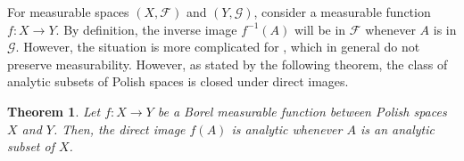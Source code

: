 \documentclass[12pt]{article}
\newtheorem*{theorem*}{Theorem}
\begin{document}

For measurable spaces $(X,\mathcal{F})$ and $(Y,\mathcal{G})$, consider a measurable function $f\colon X\rightarrow Y$. By definition, the inverse image $f^{-1}(A)$ will be in $\mathcal{F}$ whenever $A$ is in $\mathcal{G}$.
However, the situation is more complicated for , which in general do not preserve measurability. However, as stated by the following theorem, the class of analytic subsets of Polish spaces is closed under direct images.

\begin{theorem*}
Let $f\colon X\rightarrow Y$ be a Borel measurable function between Polish spaces $X$ and $Y$. Then, the direct image $f(A)$ is analytic whenever $A$ is an analytic subset of $X$.
\end{theorem*}

\end{document}
